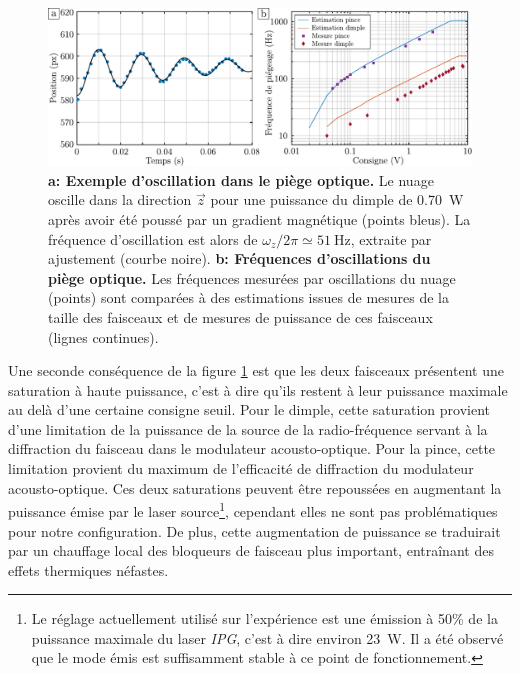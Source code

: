 \begin{figure}
\centering
\includegraphics[width=\textwidth]{Fig/Modif_exp/frequences_piege_optique.pdf}
\caption{\textbf{a: Exemple d'oscillation dans le piège optique.} Le nuage oscille dans la direction $\vec{z}$ pour une puissance du dimple de \SI{0.70}{\watt} après avoir été poussé par un gradient magnétique (points bleus). La fréquence d'oscillation est alors de $\omega_z /2\pi \simeq \SI{51}{\hertz}$, extraite par ajustement (courbe noire). \textbf{b: Fréquences d'oscillations du piège optique.} Les fréquences mesurées par oscillations du nuage (points) sont comparées à des estimations issues de mesures de la taille des faisceaux et de mesures de puissance de ces faisceaux (lignes continues).}
\label{fig:frequences_piege_optique}
\end{figure}



Une seconde conséquence de la figure \ref{fig:frequences_piege_optique} est que les deux faisceaux présentent une saturation à haute puissance, c'est à dire qu'ils restent à leur puissance maximale au delà d'une certaine consigne seuil. Pour le dimple, cette saturation provient d'une limitation de la puissance de la source de la radio-fréquence servant à la diffraction du faisceau dans le modulateur acousto-optique. Pour la pince, cette limitation provient du maximum de l'efficacité de diffraction du modulateur acousto-optique. Ces deux saturations peuvent être repoussées en augmentant la puissance émise par le laser source\footnote{Le réglage actuellement utilisé sur l'expérience est une émission à 50\% de la puissance maximale du laser \emph{IPG}, c'est à dire environ \SI{23}{\watt}. Il a été observé que le mode émis est suffisamment stable à ce point de fonctionnement.}, cependant elles ne sont pas problématiques pour notre configuration. De plus, cette augmentation de puissance se traduirait par un chauffage local des bloqueurs de faisceau plus important, entraînant des effets thermiques néfastes.












